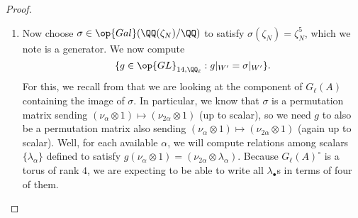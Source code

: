 \documentclass[../thesis.tex]{subfiles}
\begin{document}
\begin{proof}
\begin{enumerate}
		\item Now choose $\sigma\in\op{Gal}(\QQ(\zeta_N)/\QQ)$ to satisfy $\sigma(\zeta_N)=\zeta_N^5$, which we note is a generator. We now compute
		\[\{g\in{\op{GL}_{14,\QQ_\ell}}:g|_{W'}=\sigma|_{W'}\}.\]
		For this, we recall from  that we are looking at the component of $G_\ell(A)$ containing the image of $\sigma$. In particular, we know that $\sigma$ is a permutation matrix sending $(\nu_\alpha\otimes1)\mapsto(\nu_{2\alpha}\otimes1)$ (up to scalar), so we need $g$ to also be a permutation matrix also sending $(\nu_\alpha\otimes1)\mapsto(\nu_{2\alpha}\otimes1)$ (again up to scalar). Well, for each available $\alpha$, we will compute relations among scalars $\{\lambda_\alpha\}$ defined to satisfy $g(\nu_\alpha\otimes1)=(\nu_{2\alpha}\otimes\lambda_\alpha)$. Because $G_\ell(A)^\circ$ is a torus of rank $4$, we are expecting to be able to write all $\lambda_\bullet$s in terms of four of them.


\end{enumerate}
\end{proof}
\end{document}
